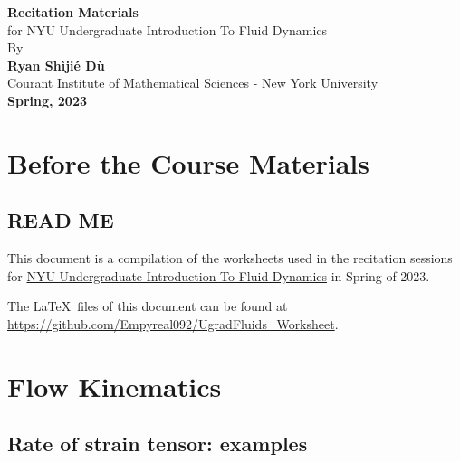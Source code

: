 \documentclass[11pt,letterpaper]{report}
\begin{document}
\begin{titlepage}
    \begin{center}
        \vspace*{4cm}
        \Huge
        \textbf{Recitation Materials} \\
        \vspace{0.5cm}
        \LARGE
        {for NYU Undergraduate Introduction To Fluid Dynamics}\\
        \vspace{3cm}
        By\\
        \vspace{0.5cm}
        \textbf{Ryan Sh\`iji\'e D\`u}\\
        \vspace{0.2cm}
        \normalsize
        {Courant Institute of Mathematical Sciences - New York University}\\
        \vspace{2cm}
        \Large
        \textbf{Spring, 2023}
        
    \end{center}
\end{titlepage}

\setcounter{tocdepth}{1}
\tableofcontents

\setcounter{chapter}{-1}
\chapter{Before the Course Materials}
\section{READ ME}
This document is a compilation of the worksheets used in the recitation sessions for \href{https://math.nyu.edu/dynamic/courses/undergrad/math-ua-230/}{NYU Undergraduate Introduction To Fluid Dynamics} in Spring of 2023. 

The \LaTeX\ files of this document can be found at \url{https://github.com/Empyreal092/UgradFluids_Worksheet}.


\chapter{Flow Kinematics}
\section{Rate of strain tensor: examples}
\end{document}
